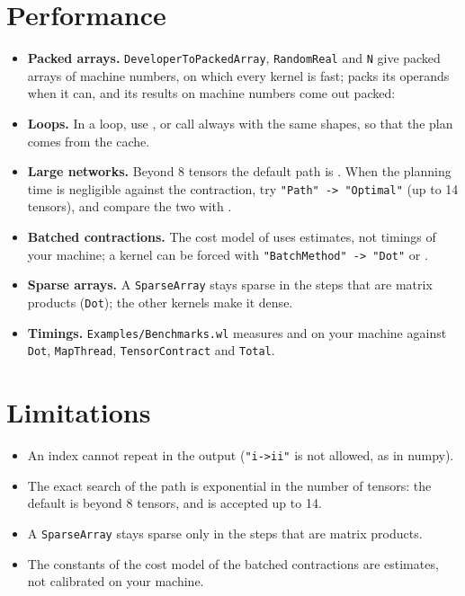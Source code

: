\documentclass[11pt,a4paper]{article}
\begin{document}
\section{Performance}
\begin{itemize}
\item \textbf{Packed arrays.} \texttt{Developer\textasciigrave ToPackedArray}, \texttt{RandomReal} and \texttt{N} give packed arrays of
  machine numbers, on which every kernel is fast;  packs its operands when it can, and its results on
  machine numbers come out packed:
\end{itemize}
\begin{itemize}
\item \textbf{Loops.} In a loop, use , or call  always with the same shapes, so that the plan
  comes from the cache.
\item \textbf{Large networks.} Beyond 8 tensors the default path is . When the planning time is negligible
  against the contraction, try \texttt{"Path" -> "Optimal"} (up to 14 tensors), and compare the two with .
\item \textbf{Batched contractions.} The cost model of  uses estimates, not timings of your machine; a kernel
  can be forced with \texttt{"BatchMethod" -> "Dot"} or .
\item \textbf{Sparse arrays.} A \texttt{SparseArray} stays sparse in the steps that are matrix products (\texttt{Dot}); the other
  kernels make it dense.
\item \textbf{Timings.} \texttt{Examples/Benchmarks.wl} measures  and  on your machine against
  \texttt{Dot}, \texttt{MapThread}, \texttt{TensorContract} and \texttt{Total}.
\end{itemize}

\section{Limitations}
\begin{itemize}
\item An index cannot repeat in the output (\texttt{"i->ii"} is not allowed, as in numpy).
\item The exact search of the path is exponential in the number of tensors: the default is  beyond 8 tensors, and
   is accepted up to 14.
\item A \texttt{SparseArray} stays sparse only in the steps that are matrix products.
\item The constants of the cost model of the batched contractions are estimates, not calibrated on your machine.
\end{itemize}
\end{document}
